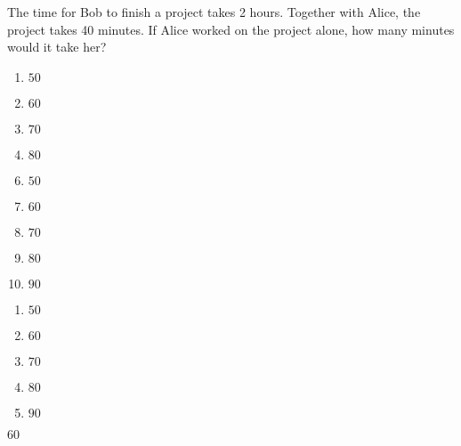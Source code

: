 


 The time for Bob to finish a
project takes 2 hours. Together with Alice, the project takes 40 minutes. If Alice
worked on the project alone, how many minutes would it take her?


\ifsat
	\begin{enumerate}[label=\Alph*)]
		\item   $50$
		\item   $60$%
		\item   $70$
		\item   $80$
	\end{enumerate}
\else
\fi

\ifacteven
	\begin{enumerate}[label=\textbf{\Alph*.},itemsep=\fill,align=left]
		\setcounter{enumii}{5}
		\item   $50$
		\item   $60$%
		\item   $70$
		\addtocounter{enumii}{1}
		\item   $80$
		\item    $90$
	\end{enumerate}
\else
\fi

\ifactodd
	\begin{enumerate}[label=\textbf{\Alph*.},itemsep=\fill,align=left]
		\item   $50$
		\item   $60$%
		\item   $70$
		\item   $80$
		\item    $90$
	\end{enumerate}
\else
\fi

\ifgridin
   $60$%
		
\else
\fi

